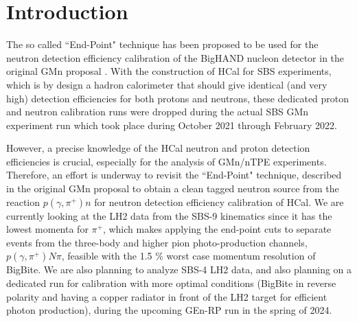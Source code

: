\section{Introduction}

The so called ``End-Point" technique has been proposed to be used for the neutron detection efficiency calibration of the BigHAND nucleon detector in the original GMn proposal \cite{gmn_original_proposal}. With the construction of HCal for SBS experiments, which is by design a hadron calorimeter that should give identical (and very high) detection efficiencies for both protons and neutrons, these dedicated proton and neutron calibration runs were dropped during the actual SBS GMn experiment run which took place during October 2021 through February 2022.

However, a precise knowledge of the HCal neutron and proton detection efficiencies is crucial, especially for the analysis of GMn/nTPE experiments. Therefore, an effort is underway to revisit the ``End-Point" technique, described in the original GMn proposal to obtain a clean tagged neutron source from the reaction $p(\gamma,\pi^+)n$ for neutron detection efficiency calibration of HCal. We are currently looking at the LH2 data from the SBS-9 kinematics since it has the lowest momenta for $\pi^+$, which makes applying the end-point cuts to separate events from the three-body and higher pion photo-production channels, $p(\gamma,\pi^+)N\pi$, feasible with the 1.5 \% worst case momentum resolution of BigBite. We are also planning to analyze SBS-4 LH2 data, and also planning on a dedicated run for calibration with more optimal conditions (BigBite in reverse polarity and having a copper radiator in front of the LH2 target for efficient photon production), during the upcoming GEn-RP run in the spring of 2024. 